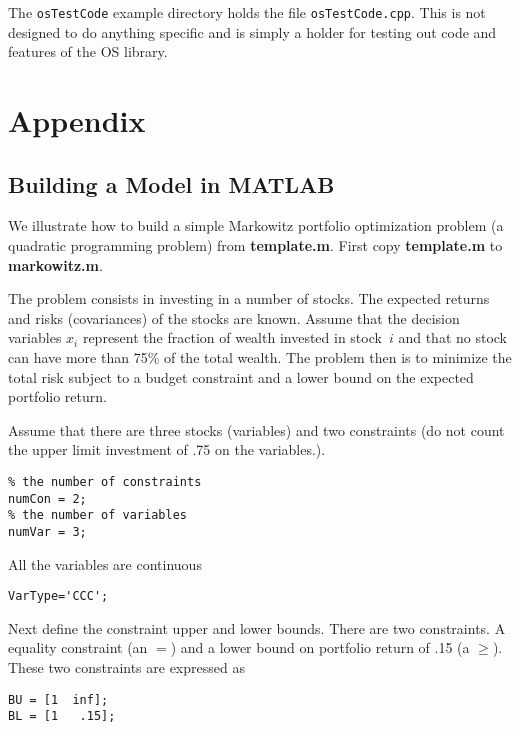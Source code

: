 \documentclass[11pt]{article}
\renewcommand{\_}{{\char"5F}}
\renewcommand{\{}{{\char"7B}}
\renewcommand{\}}{{\char"7D}}
\renewcommand{\^}{{\char"0D}}
\renewcommand{\'}{{\char"0D}}
\begin{document}
The {\tt osTestCode} example directory holds the file {\tt osTestCode.cpp}. This is not designed to do anything specific and is simply a holder for testing out code and features of the OS library.

\section{Appendix}\label{section:appendix}


\subsection{Building a Model in MATLAB}

We illustrate how to build a simple Markowitz portfolio optimization problem (a quadratic programming problem) from {\bf template.m}. First copy {\bf template.m} to {\bf markowitz.m}.

The problem consists in investing  in a number of stocks. The expected returns and risks
(covariances) of the stocks are known. Assume that the decision variables $x_i$
represent the fraction of wealth invested in stock~$i$ and that no stock can have
more than 75\% of the total wealth. The problem then is to minimize the total risk
subject to a budget constraint and a lower bound on the expected portfolio return.

Assume that there are three stocks (variables) and two constraints (do not count the upper limit investment of .75 on the variables.).


\begin{verbatim}
% the number of constraints
numCon = 2;
% the number of variables
numVar = 3;
\end{verbatim}



All the variables are continuous


\begin{verbatim}
VarType='CCC';
\end{verbatim}


Next define the constraint upper and lower bounds. There are two constraints. A equality  constraint (an $=$) and a lower bound on portfolio return of .15 (a $\ge$). These two constraints are expressed as



\begin{verbatim}
BU = [1  inf];
BL = [1   .15];
\end{verbatim}
\end{document}
